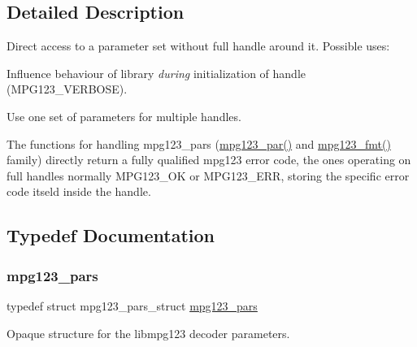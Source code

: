 \subsection{Detailed Description}
Direct access to a parameter set without full handle around it. Possible uses\+:
\begin{DoxyItemize}
\item Influence behaviour of library {\itshape during} initialization of handle (M\+P\+G123\+\_\+\+V\+E\+R\+B\+O\+SE).
\item Use one set of parameters for multiple handles.
\end{DoxyItemize}

The functions for handling mpg123\+\_\+pars (\hyperlink{group__mpg123__advpar_ga1264032012d421572198dda37ed88bd2}{mpg123\+\_\+par()} and \hyperlink{group__mpg123__advpar_ga0a4e4931437176e1365a98d5af921a6a}{mpg123\+\_\+fmt()} family) directly return a fully qualified mpg123 error code, the ones operating on full handles normally M\+P\+G123\+\_\+\+OK or M\+P\+G123\+\_\+\+E\+RR, storing the specific error code itseld inside the handle. 

\subsection{Typedef Documentation}
\mbox{\label{group__mpg123__advpar_ga3983578625af3bb6dc7e3b74d0cab4aa}} 
\subsubsection{\texorpdfstring{mpg123\+\_\+pars}{mpg123\_pars}\hspace{0.1cm}{\footnotesize\ttfamily [1/2]}}
{\footnotesize\ttfamily typedef struct mpg123\+\_\+pars\+\_\+struct \hyperlink{group__mpg123__advpar_ga3983578625af3bb6dc7e3b74d0cab4aa}{mpg123\+\_\+pars}}

Opaque structure for the libmpg123 decoder parameters. \mbox{\label{group__mpg123__advpar_ga3983578625af3bb6dc7e3b74d0cab4aa}} 
